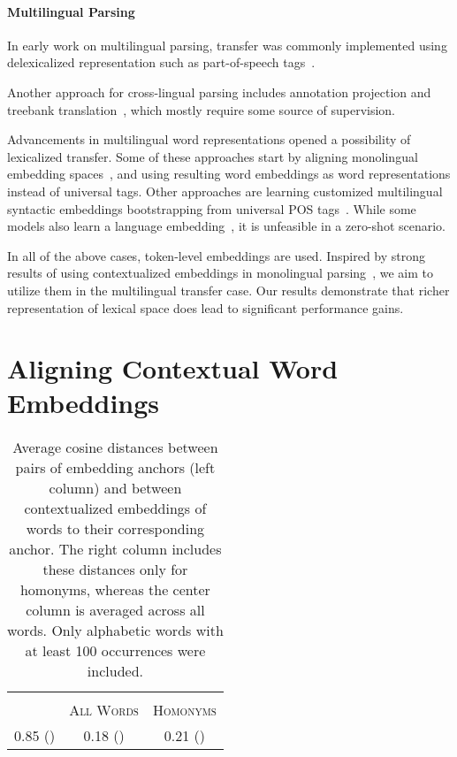 \documentclass[11pt,a4paper]{article}
\begin{document}
\paragraph{Multilingual Parsing}
In early work on multilingual parsing, transfer was commonly implemented using delexicalized representation such as part-of-speech tags~\cite{mcdonald2011multi, petrov2012universal, naseem2012selective, tiedemann2015cross}.  

Another approach for cross-lingual parsing includes annotation projection and treebank translation~\cite{xiao2015annotation,wang_galactic_2016,Tiedemann2017cross}, which mostly require some source of supervision.

Advancements in multilingual word representations opened a possibility of lexicalized transfer. Some of these approaches start by aligning monolingual embedding spaces~\cite{zhang_hierarchical_2015, guo2015cross, guo_representation_2016, ammar_one_2016}, and using resulting word embeddings as word representations instead of universal tags. Other approaches are learning customized multilingual syntactic embeddings bootstrapping from universal POS tags~\cite{duong2015cross}. While some models also learn a language embedding~\citep{ammar_one_2016, de_lhoneux2018parameter}, it is unfeasible in a zero-shot scenario.


In all of the above cases, token-level embeddings are used. Inspired by strong results of using contextualized embeddings in monolingual parsing~\cite{che_towards_2018, wang2018improved, clark2018semi}, we aim to utilize them in  the multilingual transfer case. 
Our results demonstrate that richer representation of lexical space does lead to significant performance gains.





 \section{Aligning Contextual Word Embeddings}\label{section:alignment}



\begin{table}[t]
\centering
\begin{tabular}{ccc}
\toprule
\multirow{2}{*}{} & \multicolumn{2}{c}{}  \\
& \textsc{All Words} & \textsc{Homonyms} \\
\midrule
0.85 ()	& 0.18 ()	& 0.21 ()  \\ \bottomrule
\end{tabular}
\caption{Average cosine distances between pairs of embedding anchors (left column) and between contextualized embeddings of words to their corresponding anchor. The right column includes these distances only for homonyms, whereas the center column is averaged across all words. Only alphabetic words with at least 100 occurrences were included.}\label{tab:dists}
\end{table} 
\end{document}
